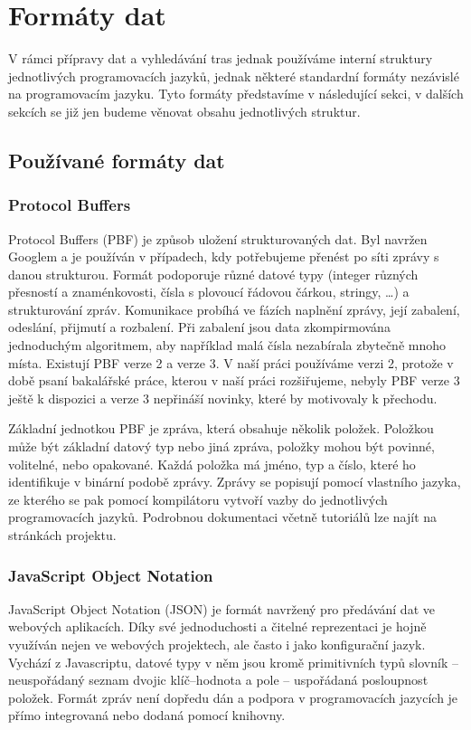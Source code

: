 \chapter{Formáty dat}
\label{ch:formaty-dat}
V rámci přípravy dat a vyhledávání tras jednak používáme interní struktury
jednotlivých programovacích jazyků, jednak některé standardní formáty nezávislé
na programovacím jazyku. Tyto formáty představíme v následující sekci, v dalších
sekcích se již jen budeme věnovat obsahu jednotlivých struktur.

\section{Používané formáty dat}

\subsection{Protocol Buffers}
Protocol Buffers\cite{PBF} (PBF) je způsob uložení strukturovaných dat. Byl navržen
Googlem a je používán v případech, kdy potřebujeme přenést po síti zprávy s
danou strukturou. Formát podoporuje různé datové typy (integer různých přesností
a znaménkovosti, čísla s plovoucí řádovou čárkou, stringy, \dots) a
strukturování zpráv. Komunikace probíhá ve fázích naplnění zprávy, její
zabalení, odeslání, přijmutí a rozbalení. Při zabalení jsou data zkompirmována
jednoduchým algoritmem, aby například malá čísla nezabírala zbytečně mnoho
místa. Existují PBF verze 2 a verze 3. V naší práci používáme verzi 2, protože v
době psaní bakalářské práce, kterou v naší práci rozšiřujeme, nebyly PBF verze 3
ještě k dispozici a verze 3 nepřináší novinky, které by motivovaly k přechodu.

Základní jednotkou PBF je zpráva, která obsahuje několik položek. Položkou může
být základní datový typ nebo jiná zpráva, položky mohou být povinné, volitelné,
nebo opakované. Každá položka má jméno, typ a číslo, které ho identifikuje v
binární podobě zprávy. Zprávy se popisují pomocí vlastního jazyka, ze kterého se
pak pomocí kompilátoru vytvoří vazby do jednotlivých programovacích jazyků. 
Podrobnou dokumentaci včetně tutoriálů lze najít na stránkách projektu.

\subsection{JavaScript Object Notation}
JavaScript Object Notation\cite{JSON} (JSON) je formát navržený pro předávání dat ve
webových aplikacích. Díky své jednoduchosti a čitelné reprezentaci je hojně
využíván nejen ve webových projektech, ale často i jako konfigurační jazyk.
Vychází z Javascriptu, datové typy v něm jsou kromě primitivních typů slovník --
neuspořádaný seznam dvojic klíč--hodnota a pole -- uspořádaná posloupnost
položek. Formát zpráv není dopředu dán a podpora v programovacích jazycích je
přímo integrovaná nebo dodaná pomocí knihovny. 

